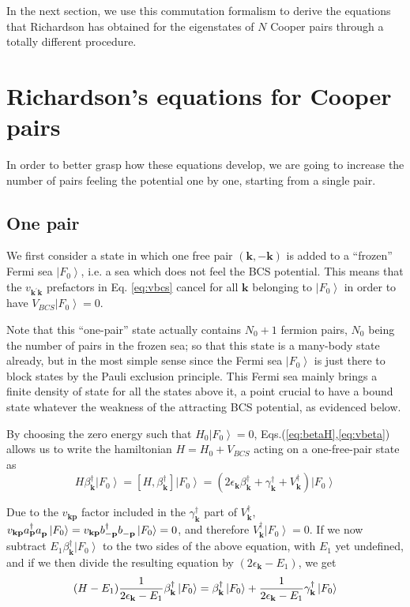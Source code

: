 \documentclass[aps,prb,superscriptaddress,showpacs,reprint,lengthcheck]{revtex4-1}
\newcommand{\vk}{\ensuremath{\mathbf{k}}}
\begin{document}
In the next section, we use this commutation formalism to derive the equations that Richardson has obtained for the eigenstates of $N$ Cooper pairs through a totally different procedure.

\section{Richardson's equations for Cooper pairs\label{sec:rich}}

In order to better grasp how these equations develop, we are going to increase the number of pairs feeling the potential one by one, starting from a single pair.

\subsection{One pair}

We first consider a state in which one free pair $(\mathbf{k} ,-\mathbf{k} )$ is added to a
``frozen'' Fermi sea $\left|F_0\right> $, i.e. a sea which does not feel the BCS potential.
This means that the $v_{\mathbf{k} ^{\prime}\mathbf{k} }$ prefactors in Eq.%
\eqref{eq:vbcs} cancel for all $\mathbf{k} $ belonging to $\left|F_0\right> $ in order to have $V_{BCS} \left|F_0\right>=0$.

 Note that this ``one-pair'' state actually contains $N_0+1$ fermion pairs, 
$N_0$ being the number of pairs in the frozen sea; so that this state is a many-body state already, but in the most simple sense since the Fermi sea $%
\left|F_0\right> $ is just there to block states by the Pauli exclusion
principle. This Fermi sea mainly brings a finite density of state for all the
states above it, a point crucial to have a bound state whatever the weakness of the attracting BCS potential, as evidenced below.

By choosing the zero energy such
that $H_0\left|F_0\right> =0$, Eqs.(\ref{eq:betaH},\ref{eq:vbeta}) allows us to write the hamiltonian $H=H_0+V_{BCS}$
acting on a one-free-pair state as 
\begin{equation}
H\beta^{\dagger}_\vk\left|F_0\right>  =\left[H,\beta^{\dagger}_\vk\right] 
\left|F_0\right> 
=\left(2\epsilon_\vk\beta^{\dagger}_\vk+\gamma^{\dagger}_\vk+V^{\dagger}_\vk%
\right) \left|F_0\right>  
\end{equation}

Due to the $v_{\mathbf{k} \mathbf{p} }$ factor included
in the $\gamma^{\dagger}_{\mathbf{k} }$ part of $V^{\dagger}_\vk$, 
 $v_{\mathbf{k} \mathbf{p} }a^{\dagger}_{\mathbf{p} }a^{}_{%
\mathbf{p} }\left|F_0\right>=v_{\mathbf{k} \mathbf{p} }b^{\dagger}_{-\mathbf{p} }b^{}_{-\mathbf{p} }\left|F_0\right>=0$,
and therefore $V^{\dagger}_\vk
\left|F_0\right> =0$.
If we now subtract $E _1\beta^{\dagger}_\vk\left|F_0\right>  $ to
the two sides of the above equation, with $E_1$ yet undefined, and if we then divide the resulting equation by $%
\left(2\epsilon_\vk-E _1\right) $, we get
\begin{equation}  \label{eq:HE1}
 (H-E_1)\frac{1}{2\epsilon_\vk-E _1} \beta^{\dagger}_\vk%
\left|F_0\right>  =\beta^{\dagger}_\vk\left|F_0\right>  +\frac{1}{%
2\epsilon_\vk-E _1} \gamma^{\dagger}_\vk\left|F_0\right>  
\end{equation}
\end{document}
